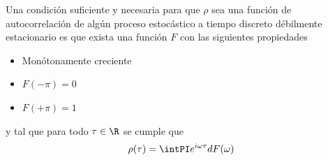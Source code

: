 \begin{teorema}[Wold]
Una condición suficiente y necesaria para que $\rho$ sea una función de autocorrelación de 
algún proceso estocástico a tiempo discreto \xt débilmente estacionario es que exista 
una función $F$ con las siguientes propiedades
\begin{itemize}
\item Monótonamente creciente
\item $F(-\pi) = 0$
\item $F(+\pi) = 1$
\end{itemize}
y tal que para todo $\tau \in \R$ se cumple que
\begin{equation*}
\rho(\tau) = \intPI e^{i \omega \tau} dF(\omega)
\end{equation*}
\label{t_wold}
\end{teorema}


